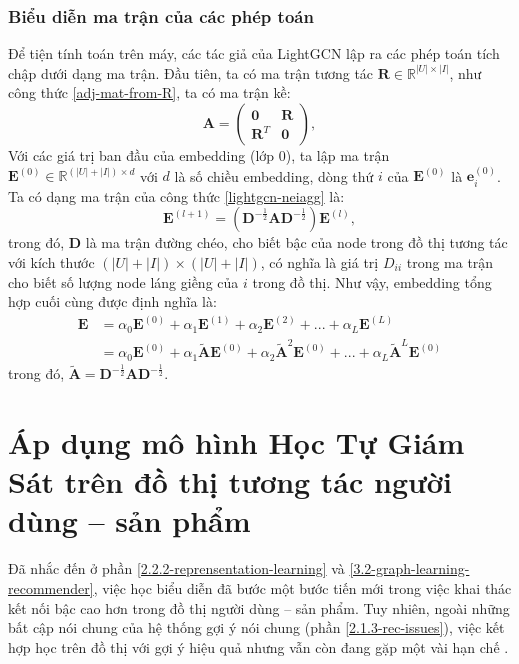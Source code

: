 \subsubsection{Biểu diễn ma trận của các phép toán}
\noindent Để tiện tính toán trên máy, các tác giả của LightGCN lập ra các phép toán tích chập dưới dạng ma trận. Đầu tiên, ta có ma trận tương tác $\mathbf{R} \in \mathbb{R}^{|U|\times|I|}$, như công thức \eqref{adj-mat-from-R}, ta có ma trận kề:
\begin{equation}
    \mathbf{A} = \begin{pmatrix}
        \mathbf{0} & \mathbf{R} \\
        \mathbf{R}^T & \mathbf{0}
    \end{pmatrix},
\end{equation}
Với các giá trị ban đầu của embedding (lớp 0), ta lập ma trận $\mathbf{E}^{(0)} \in \mathbb{R}^{(|U| + |I|) \times d}$ với $d$ là số chiều embedding, dòng thứ $i$ của $\mathbf{E}^{(0)}$ là $\mathbf{e}_i^{(0)}$. Ta có dạng ma trận của công thức \eqref{lightgcn-neiagg} là:
\begin{equation}
    \mathbf{E}^{(l+1)} = (\mathbf{D}^{-\frac{1}{2}} \mathbf{A} \mathbf{D}^{-\frac{1}{2}}) \mathbf{E}^{(l)},
\end{equation}
trong đó, $\mathbf{D}$ là ma trận đường chéo, cho biết bậc của node trong đồ thị tương tác với kích thước $(|U| + |I|) \times (|U| + |I|)$, có nghĩa là giá trị $D_{ii}$ trong ma trận cho biết số lượng node láng giềng của $i$ trong đồ thị. Như vậy, embedding tổng hợp cuối cùng được định nghĩa là:
\begin{equation}
    \begin{aligned}
        \mathbf{E} & = \alpha_0 \mathbf{E}^{(0)} + \alpha_1 \mathbf{E}^{(1)} + \alpha_2 \mathbf{E}^{(2)} + ... + \alpha_L \mathbf{E}^{(L)} \\
                   & = \alpha_0 \mathbf{E}^{(0)} + \alpha_1 \tilde{\mathbf{A}} \mathbf{E}^{(0)} + \alpha_2 \tilde{\mathbf{A}}^2 \mathbf{E}^{(0)} + ... + \alpha_L \tilde{\mathbf{A}}^L \mathbf{E}^{(0)}
    \end{aligned}
    \label{eq:lightgcn-encoder}
\end{equation}
trong đó, $\tilde{\mathbf{A}} = \mathbf{D}^{-\frac{1}{2}} \mathbf{A} \mathbf{D}^{-\frac{1}{2}}$.


\section{Áp dụng mô hình Học Tự Giám Sát trên đồ thị tương tác người dùng -- sản phẩm}
\noindent Đã nhắc đến ở phần \ref{2.2.2-reprensentation-learning} và \ref{3.2-graph-learning-recommender}, việc học biểu diễn đã bước một bước tiến mới trong việc khai thác kết nối bậc cao hơn trong đồ thị người dùng -- sản phẩm. Tuy nhiên, ngoài những bất cập nói chung của hệ thống gợi ý nói chung (phần \ref{2.1.3-rec-issues}), việc kết hợp học trên đồ thị với gợi ý hiệu quả nhưng vẫn còn đang gặp một vài hạn chế \cite{SGL}.

